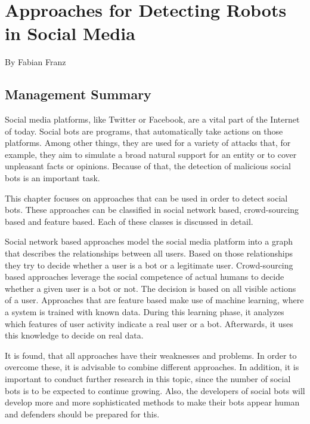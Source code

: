 \newpage
\chapter{Approaches for Detecting Robots \\ in Social Media}
\small{By Fabian Franz}
\section*{Management Summary}
Social media platforms, like Twitter or Facebook, are a vital part of the Internet of today. Social bots are programs, that automatically take actions on those platforms. Among other things, they are used for a variety of attacks that, for example, they aim to simulate a broad natural support for an entity or to cover unpleasant facts or opinions. Because of that, the detection of malicious social bots is an important task.

This chapter focuses on approaches that can be used in order to detect social bots. These approaches can be classified in social network based, crowd-sourcing based and feature based. Each of these classes is discussed in detail.

Social network based approaches model the social media platform into a graph that describes the relationships between all users. Based on those relationships they try to decide whether a user is a bot or a legitimate user.
Crowd-sourcing based approaches leverage the social competence of actual humans to decide whether a given user is a bot or not. The decision is based on all visible actions of a user. 
Approaches that are feature based make use of machine learning, where a system is trained with known data. During this learning phase, it analyzes which features of user activity indicate a real user or a bot. Afterwards, it uses this knowledge to decide on real data.

It is found, that all approaches have their weaknesses and problems. In order to overcome these, it is advisable to combine different approaches. In addition, it is important to conduct further research in this topic, since the number of social bots is to be expected to continue growing. Also, the developers of social bots will develop more and more sophisticated methods to make their bots appear human and defenders should be prepared for this. 


